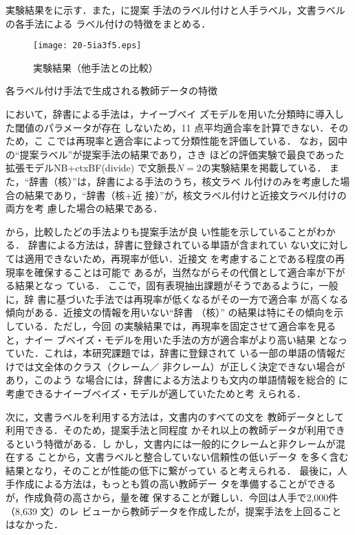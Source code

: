 \documentclass[japanese]{jnlp_1.4}
\def\fig#1{}
\def\tab#1{}
\begin{document}
実験結果を\fig{baseline}に示す．また，\tab{data}に提案
手法のラベル付けと人手ラベル，文書ラベルの各手法による
ラベル付けの特徴をまとめる．

\begin{figure}[b]
 \begin{center}
 \texttt{[image: 20-5ia3f5.eps]}
 \end{center}
 \caption{実験結果（他手法との比較）}
 \label{fig:baseline}
\end{figure}
\begin{table}[b]
 \caption{各ラベル付け手法で生成される教師データの特徴}
 \label{tab:data}

\end{table}

\fig{baseline}において，辞書による手法は，ナイーブベイ
ズモデルを用いた分類時に導入した閾値のパラメータが存在
しないため，11 点平均適合率を計算できない．そのため，こ
こでは再現率と適合率によって分類性能を評価している．
なお，図中の``提案ラベル''が提案手法の結果であり，さき
ほどの評価実験で最良であった拡張モデルNB+ctxBF(divide)
で文脈長$N=2$の実験結果を掲載している．
また，``辞書（核）''は，辞書による手法のうち，核文ラベ
ル付けのみを考慮した場合の結果であり，``辞書（核+近
  接）''が，核文ラベル付けと近接文ラベル付けの両方を考
慮した場合の結果である．

\fig{baseline}から，比較したどの手法よりも提案手法が良
い性能を示していることがわかる．
辞書による方法は，辞書に登録されている単語が含まれてい
ない文に対しては適用できないため，再現率が低い．近接文
を考慮することである程度の再現率を確保することは可能で
あるが，当然ながらその代償として適合率が下がる結果となっ
ている．
ここで，固有表現抽出課題がそうであるように，一般に，辞
書に基づいた手法では再現率が低くなるがその一方で適合率
が高くなる傾向がある．近接文の情報を用いない``辞書
（核）'' の結果は特にその傾向を示している．ただし，今回
の実験結果では，再現率を固定させて適合率を見ると，ナイー
ブベイズ・モデルを用いた手法の方が適合率がより高い結果
となっていた．これは，本研究課題では，辞書に登録されて
いる一部の単語の情報だけでは文全体のクラス（クレーム／
  非クレーム）が正しく決定できない場合があり，このよう
な場合には，辞書による方法よりも文内の単語情報を総合的
に考慮できるナイーブベイズ・モデルが適していたためと考
えられる．

次に，文書ラベルを利用する方法は，文書内のすべての文を
教師データとして利用できる．そのため，提案手法と同程度
かそれ以上の教師データが利用できるという特徴がある．し
かし，文書内には一般的にクレームと非クレームが混在する
ことから，文書ラベルと整合していない信頼性の低いデータ
を多く含む結果となり，そのことが性能の低下に繋がってい
ると考えられる．
最後に，人手作成による方法は，もっとも質の高い教師デー
タを準備することができるが，作成負荷の高さから，量を確
保することが難しい．今回は人手で2,000件（8,639 文）のレ
ビューから教師データを作成したが，提案手法を上回ること
はなかった．
\end{document}
